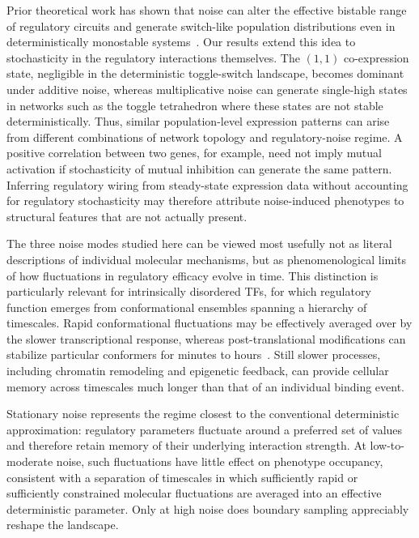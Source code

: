 \documentclass[11pt]{article}
\begin{document}
Prior theoretical work has shown that noise can alter the effective bistable range of regulatory circuits and generate switch-like population distributions even in deterministically monostable systems~\cite{OchabMarcinek2010w}. Our results extend this idea to stochasticity in the regulatory interactions themselves. The $(1, 1)$ co-expression state, negligible in the deterministic toggle-switch landscape, becomes dominant under additive noise, whereas multiplicative noise can generate single-high states in networks such as the toggle tetrahedron where these states are not stable deterministically. Thus, similar population-level expression patterns can arise from different combinations of network topology and regulatory-noise regime. A positive correlation between two genes, for example, need not imply mutual activation if stochasticity of mutual inhibition can generate the same pattern. Inferring regulatory wiring from steady-state expression data without accounting for regulatory stochasticity may therefore attribute noise-induced phenotypes to structural features that are not actually present.

The three noise modes studied here can be viewed most usefully not as literal descriptions of individual molecular mechanisms, but as phenomenological limits of how fluctuations in regulatory efficacy evolve in time. This distinction is particularly relevant for intrinsically disordered TFs, for which regulatory function emerges from conformational ensembles spanning a hierarchy of timescales. Rapid conformational fluctuations may be effectively averaged over by the slower transcriptional response, whereas post-translational modifications can stabilize particular conformers for minutes to hours~\cite{Kulkarni2022, Kulkarni2019}. Still slower processes, including chromatin remodeling and epigenetic feedback, can provide cellular memory across timescales much longer than that of an individual binding event.

Stationary noise represents the regime closest to the conventional deterministic approximation: regulatory parameters fluctuate around a preferred set of values and therefore retain memory of their underlying interaction strength. At low-to-moderate noise, such fluctuations have little effect on phenotype occupancy, consistent with a separation of timescales in which sufficiently rapid or sufficiently constrained molecular fluctuations are averaged into an effective deterministic parameter. Only at high noise does boundary sampling appreciably reshape the landscape.
\end{document}
